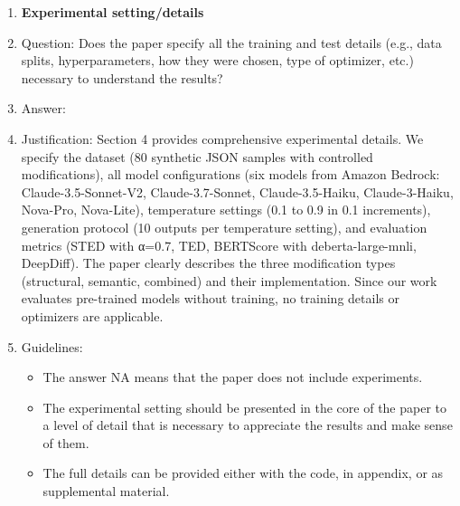 \documentclass{article}
\begin{document}
\begin{enumerate}
\item {\bf Experimental setting/details}
    \item[] Question: Does the paper specify all the training and test details (e.g., data splits, hyperparameters, how they were chosen, type of optimizer, etc.) necessary to understand the results?
    \item[] Answer: \answerYes{} %
    \item[] Justification: \justification Section 4 provides comprehensive experimental details. We specify the dataset (80 synthetic JSON samples with controlled modifications), all model configurations (six models from Amazon Bedrock: Claude-3.5-Sonnet-V2, Claude-3.7-Sonnet, Claude-3.5-Haiku, Claude-3-Haiku, Nova-Pro, Nova-Lite), temperature settings (0.1 to 0.9 in 0.1 increments), generation protocol (10 outputs per temperature setting), and evaluation metrics (STED with α=0.7, TED, BERTScore with deberta-large-mnli, DeepDiff). The paper clearly describes the three modification types (structural, semantic, combined) and their implementation. Since our work evaluates pre-trained models without training, no training details or optimizers are applicable.{}
    \item[] Guidelines:
    \begin{itemize}
        \item The answer NA means that the paper does not include experiments.
        \item The experimental setting should be presented in the core of the paper to a level of detail that is necessary to appreciate the results and make sense of them.
        \item The full details can be provided either with the code, in appendix, or as supplemental material.
    \end{itemize}


\end{enumerate}
\end{document}
